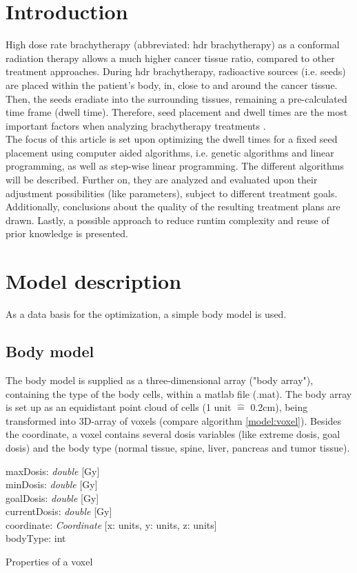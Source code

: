 \documentclass[12pt]{article}
\begin{document}


\tableofcontents
\newpage

\section{Introduction}
High dose rate brachytherapy (abbreviated: hdr brachytherapy) as a conformal radiation therapy allows a much higher cancer tissue ratio, compared to other treatment approaches. During hdr brachytherapy, radioactive sources (i.e. seeds) are placed within the patient's body, in, close to and around the cancer tissue. Then, the seeds eradiate into the surrounding tissues, remaining a pre-calculated time frame (dwell time). Therefore, seed placement and dwell times are the most important factors when analyzing brachytherapy treatments \cite{brachytherapy}. \\
The focus of this article is set upon optimizing the dwell times for a fixed seed placement using computer aided algorithms, i.e. genetic algorithms and linear programming, as well as step-wise linear programming. The different algorithms will be described. Further on, they are analyzed and evaluated upon their adjustment possibilities (like parameters), subject to different treatment goals. Additionally, conclusions about the quality of the resulting treatment plans are drawn. Lastly, a possible approach to reduce runtim complexity and reuse of prior knowledge is presented.

\section{Model description}
As a data basis for the optimization, a simple body model is used. 

\subsection{Body model}
The body model is supplied as a three-dimensional array ("body array"), containing the type of the body cells, within a matlab file (.mat). The body array is set up as an equidistant point cloud of cells (1 unit $\widehat{=}$ 0.2cm), being transformed into 3D-array of voxels (compare algorithm \ref{model:voxel}). Besides the coordinate, a voxel contains several dosis variables (like extreme dosis, goal dosis) and the body type (normal tissue, spine, liver, pancreas and tumor tissue). \\
\begin{algorithm}[H]
maxDosis: \textit{double} [Gy] \\
minDosis: \textit{double} [Gy] \\
goalDosis: \textit{double} [Gy] \\
currentDosis: \textit{double} [Gy] \\
coordinate: \textit{Coordinate} [x: units, y: units, z: units] \\
bodyType: int
\label{model:voxel}
\caption{Properties of a voxel}
\end{algorithm}
\end{document}
